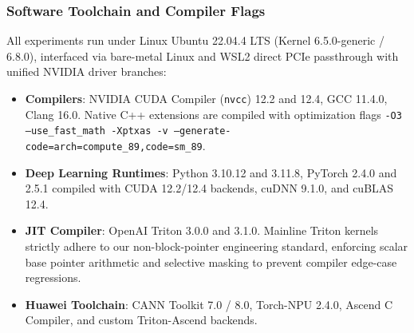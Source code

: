 \subsubsection{Software Toolchain and Compiler Flags}
All experiments run under Linux Ubuntu 22.04.4 LTS (Kernel 6.5.0-generic / 6.8.0), interfaced via bare-metal Linux and WSL2 direct PCIe passthrough with unified NVIDIA driver branches:
\begin{itemize}
    \item \textbf{Compilers}: NVIDIA CUDA Compiler (\texttt{nvcc}) 12.2 and 12.4, GCC 11.4.0, Clang 16.0. Native C++ extensions are compiled with optimization flags \texttt{-O3 --use\_fast\_math -Xptxas -v --generate-code=arch=compute\_89,code=sm\_89}.
    \item \textbf{Deep Learning Runtimes}: Python 3.10.12 and 3.11.8, PyTorch 2.4.0 and 2.5.1 compiled with CUDA 12.2/12.4 backends, cuDNN 9.1.0, and cuBLAS 12.4.
    \item \textbf{JIT Compiler}: OpenAI Triton 3.0.0 and 3.1.0. Mainline Triton kernels strictly adhere to our non-block-pointer engineering standard, enforcing scalar base pointer arithmetic and selective masking to prevent compiler edge-case regressions.
    \item \textbf{Huawei Toolchain}: CANN Toolkit 7.0 / 8.0, Torch-NPU 2.4.0, Ascend C Compiler, and custom Triton-Ascend backends.
\end{itemize}

